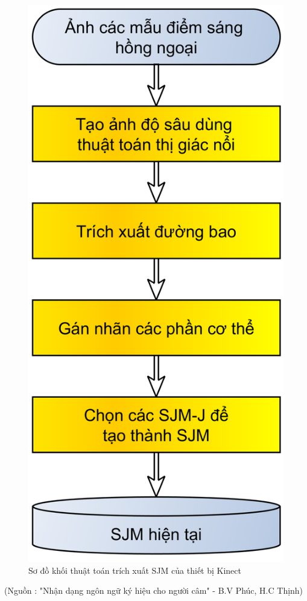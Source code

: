 \FloatBarrier
\begin{figure}[htp]
\begin{center}
\includegraphics[scale=0.15]{chap3/c3_figs/TrichKhungXuong.png}
\end{center}
\caption{Sơ đồ khối thuật toán trích xuất SJM của thiết bị Kinect}
\label{fig:TrichKhungXuong}
\end{figure}
\FloatBarrier
\centerline{(Nguồn : "Nhận dạng ngôn ngữ ký hiệu cho người câm" - B.V Phúc, H.C Thịnh)}

